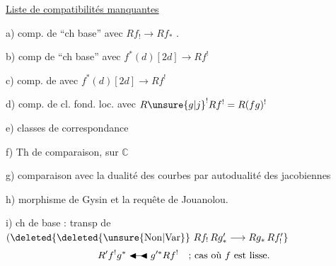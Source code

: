 
\uline{Liste de compatibilités manquantes}

a) comp. de ``ch base'' avec $Rf_!\longrightarrow Rf_*$ . 

b) comp de ``ch base'' avec $f^*(d)[2d]\longrightarrow Rf^!$

c) comp. de  avec $f^*(d)[2d]\longrightarrow Rf^!$

d) comp. de cl. fond. loc. avec $R{\unsure{g|j}}^!Rf^!=R(fg)^!$

e) classes de correspondance

f) Th de comparaison, sur $\mathbb C$

g) comparaison avec la dualité des courbes par autodualité des jacobiennes

h) morphisme de Gysin et la requête de Jouanolou.

i) ch de base : transp de $(\deleted{\deleted{\unsure{\mathrm{Non}|\mathrm{Var}}}\ Rf_!\,Rg'_*\longrightarrow Rg_*\,Rf'_!}$
\[
R'f^!g^*\mathrel{\blacktriangleleft\mkern-4mu\relbar\mkern-4mu\blacktriangleleft}g'^*Rf^!\quad\text{; cas où }f\text{ est lisse.}
\]

